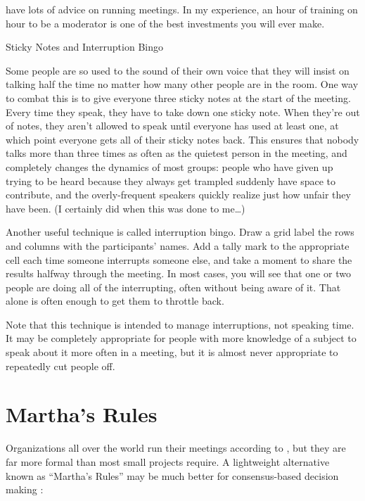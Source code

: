\cite{Brow2007,Broo2016,Roge2018} have lots of advice on running meetings.
In my experience,
an hour of training on hour to be a moderator
is one of the best investments you will ever make.

\begin{aside}{Sticky Notes and Interruption Bingo}

  Some people are so used to the sound of their own voice
  that they will insist on talking half the time
  no matter how many other people are in the room.
  One way to combat this is to give everyone three sticky notes
  at the start of the meeting.
  Every time they speak,
  they have to take down one sticky note.
  When they're out of notes,
  they aren't allowed to speak until everyone has used at least one,
  at which point everyone gets all of their sticky notes back.
  This ensures that nobody talks more than three times as often as
  the quietest person in the meeting,
  and completely changes the dynamics of most groups:
  people who have given up trying to be heard because they always get trampled
  suddenly have space to contribute,
  and the overly-frequent speakers quickly realize just how unfair they have been.
  (I certainly did when this was done to me{\ldots})

  Another useful technique is called interruption bingo.
  Draw a grid label the rows and columns with the participants' names.
  Add a tally mark to the appropriate cell
  each time someone interrupts someone else,
  and take a moment to share the results halfway through the meeting.
  In most cases,
  you will see that one or two people are doing all of the interrupting,
  often without being aware of it.
  That alone is often enough to get them to throttle back.

  Note that this technique is intended to manage interruptions,
  not speaking time.
  It may be completely appropriate for people with more knowledge of a subject
  to speak about it more often in a meeting,
  but it is almost never appropriate to repeatedly cut people off.

\end{aside}

\section{Martha's Rules}\label{s:meetings-marthas-rules}

Organizations all over the world run their meetings according to
,
but they are far more formal than most small projects require.
A lightweight alternative known as ``Martha's Rules''
may be much better for consensus-based decision making \cite{Mina1986}:

